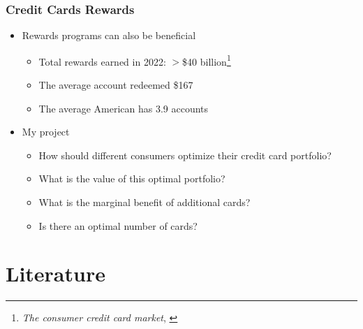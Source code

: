 \begin{frame}
    \frametitle{Credit Cards Rewards}
    \begin{itemize}
        \item<+-> Rewards programs can also be beneficial
        \begin{itemize}
            \item Total rewards earned in 2022: $>$\$40 billion\footnote{\emph{The consumer credit card market}, \citet{cfpb:2023}}
            \item The average account redeemed \$167
            \item The average American has 3.9 accounts
        \end{itemize}
        \bigskip
        \item<+-> My project
        \begin{itemize}
            \item How should different consumers optimize their credit card portfolio?
            \item What is the value of this optimal portfolio?
            \item What is the marginal benefit of additional cards?
            \item Is there an optimal number of cards?
        \end{itemize}
    \end{itemize}
\end{frame}
    



\section{Literature}

